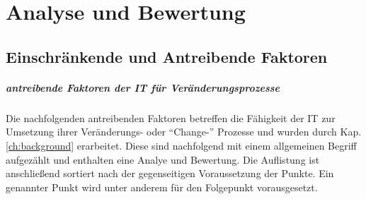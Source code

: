 \chapter{Analyse und Bewertung}
\label{chapter:evaluation}

\section{Einschränkende und Antreibende Faktoren}
\label{section:regulatorik-umgang}

\paragraph{antreibende Faktoren der IT für Veränderungsprozesse}
Die nachfolgenden antreibenden Faktoren betreffen die Fähigkeit der IT zur Umsetzung ihrer Veränderungs- oder \enquote{Change-} Prozesse und wurden durch Kap. \ref{ch:background} erarbeitet. Diese sind nachfolgend mit einem allgemeinen Begriff aufgezählt und enthalten eine Analye und Bewertung. Die Auflistung ist anschließend sortiert nach der gegenseitigen Voraussetzung der Punkte. Ein genannter Punkt wird unter anderem für den Folgepunkt vorausgesetzt.

